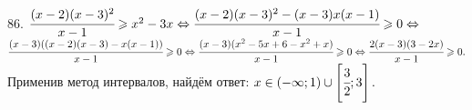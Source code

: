 86. $\cfrac{(x-2)(x-3)^2}{x-1}\geqslant x^2-3x\Leftrightarrow \cfrac{(x-2)(x-3)^2-(x-3)x(x-1)}{x-1}\geqslant0\Leftrightarrow$\\
$\cfrac{(x-3)((x-2)(x-3)-x(x-1))}{x-1}\geqslant0\Leftrightarrow\cfrac{(x-3)(x^2-5x+6-x^2+x)}{x-1}\geqslant0
\Leftrightarrow \cfrac{2(x-3)(3-2x)}{x-1}\geqslant0.$ Применив метод интервалов, найдём ответ: $x\in(-\infty;1)\cup\left[\cfrac{3}{2};3\right].$
\begin{figure}[ht!]
\end{figure}\\
